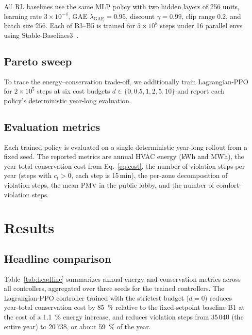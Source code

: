 \documentclass[11pt,a4paper]{article}
\begin{document}
All RL baselines use the same MLP policy with two hidden layers of
256 units, learning rate $3\times 10^{-4}$, GAE
$\lambda_{\mathrm{GAE}}=0.95$, discount $\gamma=0.99$, clip range
$0.2$, and batch size $256$. Each of B3--B5 is trained for
$5\times 10^{5}$ steps under 16 parallel envs using
Stable-Baselines3~\citep{raffin2021sb3}.

\subsection{Pareto sweep}

To trace the energy--conservation trade-off, we additionally train
Lagrangian-PPO for $2\times 10^{5}$ steps at six cost budgets
$d\in\{0,0.5,1,2,5,10\}$ and report each policy's deterministic
year-long evaluation.

\subsection{Evaluation metrics}\label{sec:metrics}

Each trained policy is evaluated on a single deterministic year-long
rollout from a fixed seed. The reported metrics are annual HVAC energy
(kWh and MWh), the year-total conservation cost from
Eq.~\eqref{eq:cost}, the number of violation steps per year (steps
with $c_t>0$, each step is 15\,min), the per-zone decomposition of
violation steps, the mean PMV in the public lobby, and the number of
comfort-violation steps.

\section{Results}\label{sec:results}

\subsection{Headline comparison}

Table~\ref{tab:headline} summarizes annual energy and conservation
metrics across all controllers, aggregated over three seeds for the
trained controllers. The Lagrangian-PPO controller trained with the
strictest budget ($d=0$) reduces year-total conservation cost by
\SI{85}{\percent} relative to the fixed-setpoint baseline B1 at the
cost of a \SI{1.1}{\percent} energy increase, and reduces violation
steps from 35\,040 (the entire year) to 20\,738, or about
\SI{59}{\percent} of the year.
\end{document}

